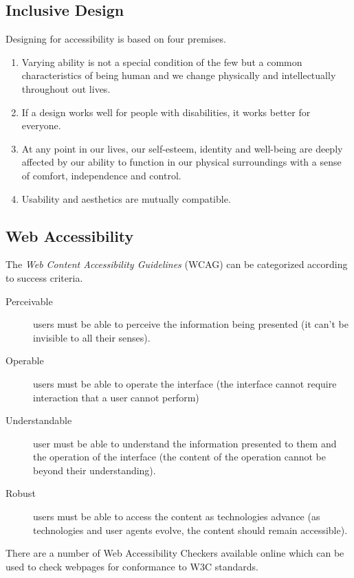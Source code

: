 \subsection*{Inclusive Design}
Designing for accessibility is based on four premises.
\begin{enumerate}
    \item Varying ability is not a special condition of the few but a common characteristics of being human and we change physically and intellectually throughout out lives.
    \item If a design works well for people with disabilities, it works better for everyone.
    \item At any point in our lives, our self-esteem, identity and well-being are deeply affected by our ability to function in our physical surroundings with a sense of comfort, independence and control.
    \item Usability and aesthetics are mutually compatible. 
\end{enumerate}

\subsection*{Web Accessibility}
The \textit{Web Content Accessibility Guidelines} (WCAG) can be categorized according to success criteria.
\begin{description}
    \item[Perceivable] users must be able to perceive the information being presented (it can't be invisible to all their senses).
    \item[Operable] users must be able to operate the interface (the interface cannot require interaction that a user cannot perform)
    \item[Understandable] user must be able to understand the information presented to them and the operation of the interface (the content of the operation cannot be beyond their understanding). 
    \item[Robust] users must be able to access the content as technologies advance (as technologies and user agents evolve, the content should remain accessible).
\end{description}

There are a number of Web Accessibility Checkers available online which can be used to check webpages for conformance to W3C standards. 